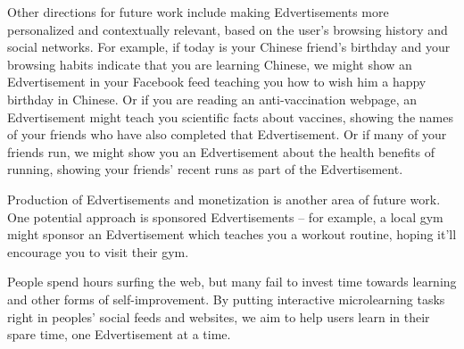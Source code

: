 \documentclass{sigchi}
\begin{document}
Other directions for future work include making Edvertisements more personalized and contextually relevant, based on the user's browsing history and social networks. For example, if today is your Chinese friend's birthday and your browsing habits indicate that you are learning Chinese, we might show an Edvertisement in your Facebook feed teaching you how to wish him a happy birthday in Chinese. Or if you are reading an anti-vaccination webpage, an Edvertisement might teach you scientific facts about vaccines, showing the names of your friends who have also completed that Edvertisement. Or if many of your friends run, we might show you an Edvertisement about the health benefits of running, showing your friends' recent runs as part of the Edvertisement. %

Production of Edvertisements and monetization is another area of future work. One potential approach is sponsored Edvertisements -- for example, a local gym might sponsor an Edvertisement which teaches you a workout routine, hoping it'll encourage you to visit their gym.


People spend hours surfing the web, but many fail to invest time towards learning and other forms of self-improvement. By putting interactive microlearning tasks right in peoples' social feeds and websites, we aim to help users learn in their spare time, one Edvertisement at a time. %




\end{document}
